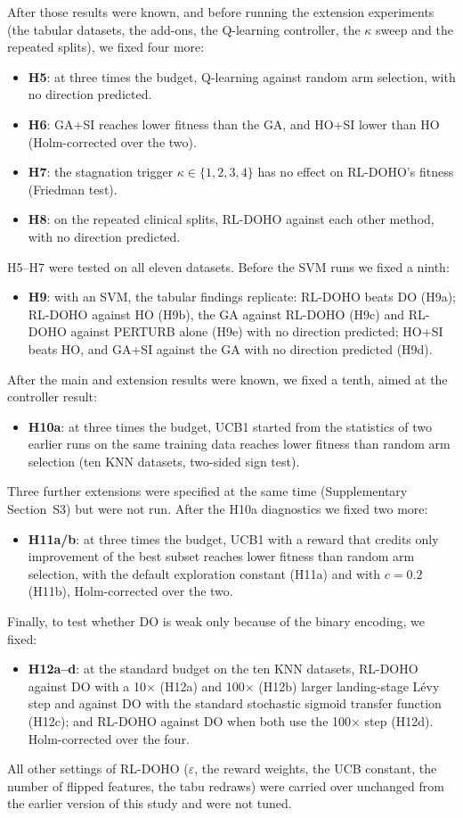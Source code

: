 \documentclass[journal]{IEEEtran}
\begin{document}
After those results were known, and before running the extension experiments (the tabular datasets, the add-ons, the Q-learning controller, the $\kappa$ sweep and the repeated splits), we fixed four more:
\begin{itemize}
\item \textbf{H5}: at three times the budget, Q-learning against random arm selection, with no direction predicted.
\item \textbf{H6}: GA+SI reaches lower fitness than the GA, and HO+SI lower than HO (Holm-corrected over the two).
\item \textbf{H7}: the stagnation trigger $\kappa\in\{1,2,3,4\}$ has no effect on RL-DOHO's fitness (Friedman test).
\item \textbf{H8}: on the repeated clinical splits, RL-DOHO against each other method, with no direction predicted.
\end{itemize}
H5--H7 were tested on all eleven datasets. Before the SVM runs we fixed a ninth:
\begin{itemize}
\item \textbf{H9}: with an SVM, the tabular findings replicate: RL-DOHO beats DO (H9a); RL-DOHO against HO (H9b), the GA against RL-DOHO (H9c) and RL-DOHO against PERTURB alone (H9e) with no direction predicted; HO+SI beats HO, and GA+SI against the GA with no direction predicted (H9d).
\end{itemize}
After the main and extension results were known, we fixed a tenth, aimed at the controller result:
\begin{itemize}
\item \textbf{H10a}: at three times the budget, UCB1 started from the statistics of two earlier runs on the same training data reaches lower fitness than random arm selection (ten KNN datasets, two-sided sign test).
\end{itemize}
Three further extensions were specified at the same time (Supplementary Section~S3) but were not run. After the H10a diagnostics we fixed two more:
\begin{itemize}
\item \textbf{H11a/b}: at three times the budget, UCB1 with a reward that credits only improvement of the best subset reaches lower fitness than random arm selection, with the default exploration constant (H11a) and with $c=0.2$ (H11b), Holm-corrected over the two.
\end{itemize}
Finally, to test whether DO is weak only because of the binary encoding, we fixed:
\begin{itemize}
\item \textbf{H12a--d}: at the standard budget on the ten KNN datasets, RL-DOHO against DO with a 10$\times$ (H12a) and 100$\times$ (H12b) larger landing-stage L\'evy step and against DO with the standard stochastic sigmoid transfer function~\cite{kennedy1997,mirjalili2013sv} (H12c); and RL-DOHO against DO when both use the 100$\times$ step (H12d). Holm-corrected over the four.
\end{itemize}
All other settings of RL-DOHO ($\varepsilon$, the reward weights, the UCB constant, the number of flipped features, the tabu redraws) were carried over unchanged from the earlier version of this study and were not tuned.
\end{document}
